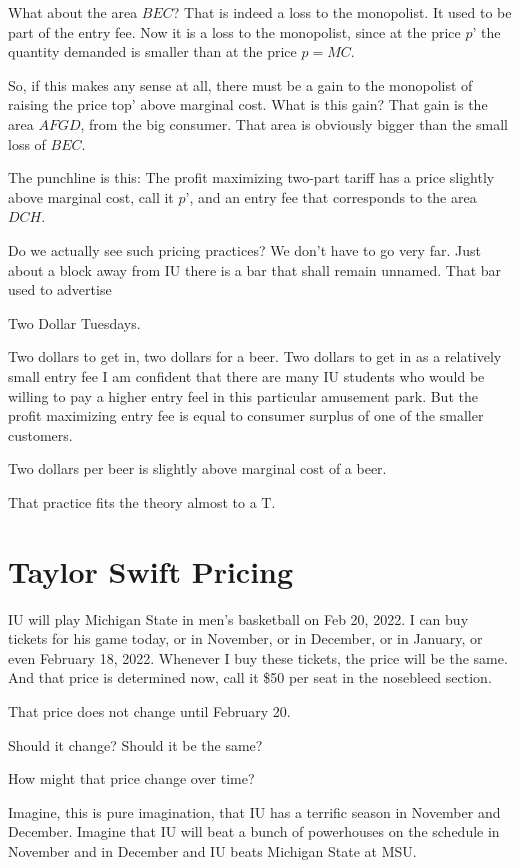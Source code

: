 \documentclass[
]{book}
\begin{document}
What about the area \(BEC\)? That is indeed a loss to the monopolist. It used to be part of the entry fee. Now it is a loss to the monopolist, since at the price \(p’\) the quantity demanded is smaller than at the price \(p = MC\).

So, if this makes any sense at all, there must be a gain to the monopolist of raising the price top' above marginal cost. What is this gain? That gain is the area \(AFGD\), from the big consumer. That area is obviously bigger than the small loss of \(BEC\).

The punchline is this: The profit maximizing two-part tariff has a price slightly above marginal cost, call it \(p’\), and an entry fee that corresponds to the area \(DCH\).

Do we actually see such pricing practices? We don't have to go very far. Just about a block away from IU there is a bar that shall remain unnamed. That bar used to advertise

Two Dollar Tuesdays.

Two dollars to get in, two dollars for a beer. Two dollars to get in as a relatively small entry fee I am confident that there are many IU students who would be willing to pay a higher entry feel in this particular amusement park. But the profit maximizing entry fee is equal to consumer surplus of one of the smaller customers.

Two dollars per beer is slightly above marginal cost of a beer.

That practice fits the theory almost to a T.

\hypertarget{taylor-swift-pricing}{%
\section{Taylor Swift Pricing}\label{taylor-swift-pricing}}

IU will play Michigan State in men's basketball on Feb 20, 2022. I can buy tickets for his game today, or in November, or in December, or in January, or even February 18, 2022. Whenever I buy these tickets, the price will be the same. And that price is determined now, call it \$50 per seat in the nosebleed section.

That price does not change until February 20.

Should it change? Should it be the same?

How might that price change over time?

Imagine, this is pure imagination, that IU has a terrific season in November and December. Imagine that IU will beat a bunch of powerhouses on the schedule in November and in December and IU beats Michigan State at MSU.
\end{document}
